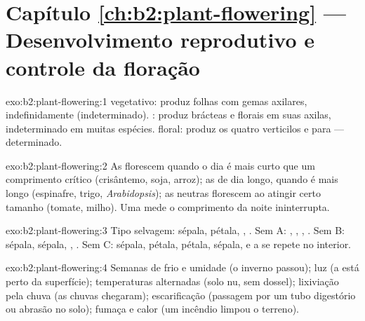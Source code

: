 \section*{Capítulo \ref{ch:b2:plant-flowering} --- Desenvolvimento reprodutivo e controle da floração}

\begin{solution}{exo:b2:plant-flowering:1}
 vegetativo: produz folhas com gemas axilares,
indefinidamente (indeterminado). : produz
brácteas e  florais em suas axilas, indeterminado em muitas
espécies.  floral: produz os quatro verticilos e para ---
determinado.
\end{solution}

\begin{solution}{exo:b2:plant-flowering:2}
As  florescem quando o dia é mais curto que um
comprimento crítico (crisântemo, soja, arroz); as de dia longo, quando
é mais longo (espinafre, trigo, \emph{Arabidopsis}); as neutras
florescem ao atingir certo tamanho (tomate, milho). Uma  mede o comprimento da noite ininterrupta.
\end{solution}

\begin{solution}{exo:b2:plant-flowering:3}
Tipo selvagem: sépala, pétala, , . Sem A: , ,
, . Sem B: sépala, sépala, , . Sem C: sépala,
pétala, pétala, sépala, e a  se repete no interior.
\end{solution}

\begin{solution}{exo:b2:plant-flowering:4}
Semanas de frio e umidade (o inverno passou); luz (a  está perto
da superfície); temperaturas alternadas (solo nu, sem dossel);
lixiviação pela chuva (as chuvas chegaram); escarificação (passagem por
um tubo digestório ou abrasão no solo); fumaça e calor (um incêndio
limpou o terreno).
\end{solution}

